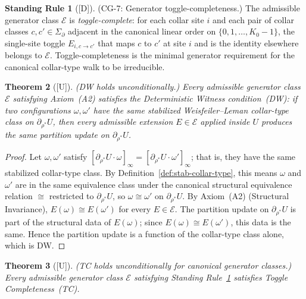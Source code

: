 \documentclass[12pt,oneside]{amsbook}
\theoremstyle{plain}
\newtheorem{theorem}{Theorem}[section]
\theoremstyle{definition}
\newtheorem{standingrule}[theorem]{Standing Rule}
\theoremstyle{remark}
\newcommand{\status}[1]{\textup{[#1]}}
\begin{document}

\begin{standingrule}[\status{D}]\label{sr:toggle-complete}
\textup{(CG-7: Generator toggle-completeness.)}
The admissible generator class $\mathcal{E}$ is \emph{toggle-complete}:
for each collar site $i$ and each pair of collar classes
$c, c' \in \Sigma_\partial$ adjacent in the canonical linear order on
$\{0,1,\ldots,K_0-1\}$, the single-site toggle $E_{i,c\to c'}$ that
maps $c$ to $c'$ at site $i$ and is the identity elsewhere belongs to
$\mathcal{E}$.  Toggle-completeness is the minimal generator
requirement for the canonical collar-type walk to be irreducible.
\end{standingrule}

\begin{theorem}[\status{U}]\label{thm:DW-from-A2}
\textup{(DW holds unconditionally.)}
Every admissible generator class $\mathcal{E}$ satisfying Axiom~(A2)
satisfies the Deterministic Witness condition~(DW): if two
configurations $\omega, \omega'$ have the same stabilized
Weisfeiler--Leman collar-type class on $\partial_{\rho^*} U$, then
every admissible extension $E \in \mathcal{E}$ applied inside $U$
produces the same partition update on $\partial_{\rho^*} U$.
\end{theorem}

\begin{proof}
Let $\omega, \omega'$ satisfy $[\partial_{\rho^*} U \cdot \omega]_\infty
= [\partial_{\rho^*} U \cdot \omega']_\infty$; that is, they have the
same stabilized collar-type class.  By
Definition~\ref{def:stab-collar-type}, this means $\omega$ and $\omega'$
are in the same equivalence class under the canonical structural
equivalence relation $\cong$ restricted to $\partial_{\rho^*} U$,
so $\omega \cong \omega'$ on $\partial_{\rho^*} U$.  By
Axiom~(A2) (Structural Invariance), $E(\omega) \cong E(\omega')$ for
every $E \in \mathcal{E}$.  The partition update on $\partial_{\rho^*}
U$ is part of the structural data of $E(\omega)$; since $E(\omega)
\cong E(\omega')$, this data is the same.  Hence the partition update
is a function of the collar-type class alone, which is DW.
\end{proof}

\begin{theorem}[\status{U}]\label{thm:TC-from-sr}
\textup{(TC holds unconditionally for canonical generator classes.)}
Every admissible generator class $\mathcal{E}$ satisfying
Standing Rule~\ref{sr:toggle-complete} satisfies Toggle
Completeness~(TC).
\end{theorem}
\end{document}
